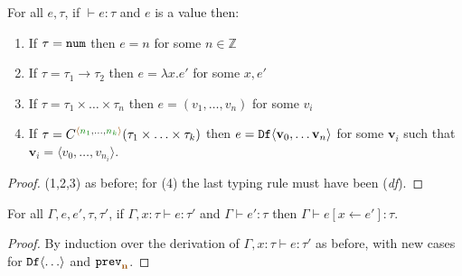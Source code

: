\begin{lemma}
\label{thm:structural-df-canon}
For all $e, \tau$, if $\vdash e : \tau$ and $e$ is a value then:
\begin{enumerate}
  \item If $\tau=\ident{num}$ then $e = n$ for some $n \in \mathbb{Z}$
  \item If $\tau=\tau_1 \rightarrow \tau_2$ then $e = \lambda x.e'$ for some $x, e'$
  \item If $\tau=\tau_1\times\ldots\times\tau_n$ then $e = (v_1, \ldots, v_n)$ for some $v_i$
  \item If $\tau=\ctyp{\alift{\cclrd{n_1}, \ldots, \cclrd{n_k}}}{(\tau_1\times\ldots\times\tau_k)}$
    then $e = \ident{Df}\langle \textbf{v}_0, \ldots \textbf{v}_n\rangle$ for some $\textbf{v}_i$
    such that $\textbf{v}_i = \langle v_0, \ldots, v_{n_i}\rangle$.
\end{enumerate}
\end{lemma}
\begin{proof}
  (1,2,3) as before; for (4) the last typing rule must have been (\emph{df}).
\end{proof}

\begin{lemma}
\label{thm:structural-df-pres-subst}
For all $\Gamma, e, e', \tau, \tau'$, if $\Gamma, x:\tau \vdash e : \tau'$ and $\Gamma \vdash e' : \tau$
then $\Gamma \vdash e[x \leftarrow e'] : \tau$.
\end{lemma}
\begin{proof}
  By induction over the derivation of $\Gamma, x:\tau \vdash e : \tau'$ as before, with new
  cases for $\textnormal{\ttfamily Df}\langle\ldots\rangle$ and $\ident{prev}_{\aclrd{\textbf{n}}}$.
\end{proof}

